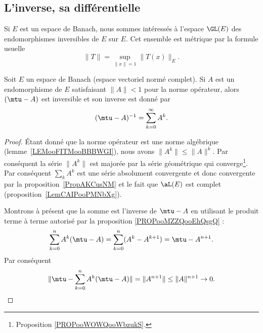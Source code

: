 \subsection{L'inverse, sa différentielle}

Si \( E\) est un espace de Banach, nous sommes intéressés à l'espace \( \GL(E)\) des endomorphismes inversibles de \( E\) sur \( E\). Cet ensemble est métrique par la formule usuelle
\begin{equation}
	\| T \|=\sup_{\| x \|=1}\| T(x) \|_E.
\end{equation}

\begin{proposition}     \label{PropQAjqUNp}
	Soit \( E\) un espace de Banach (espace vectoriel normé complet). Si \( A\) est un endomorphisme de \( E\) satisfaisant  \( \| A \|<1\) pour la norme opérateur, alors \( (\mtu-A)\) est inversible et son inverse est donné par
	\begin{equation}
		(\mtu-A)^{-1}=\sum_{k=0}^{\infty}A^k.
	\end{equation}
\end{proposition}

\begin{proof}
	Étant donné que la norme opérateur est une norme algébrique (lemme~\ref{LEMooFITMooBBBWGI}), nous avons \( \| A^k \|\leq \| A \|^k\). Par conséquent la série \( \| A^k \|\) est majorée par la série géométrique qui converge\footnote{Proposition \ref{PROPooWOWQooWbzukS}.}. Par conséquent \( \sum_{k}A^k\) est une série absolument convergente et donc convergente par la proposition~\ref{PropAKCusNM} et le fait que \( \aL(E)\) est complet (proposition~\ref{LemCAIPooPMNbXg}).

	Montrons à présent que la somme est l'inverse de \( \mtu-A\) en utilisant le produit terme à terme autorisé par la proposition \ref{PROPooMZZQooEhQsgQ} :
	\begin{equation}
		\sum_{k=0}^nA^k(\mtu-A)=\sum_{k=0}^n(A^k-A^{k+1})=\mtu-A^{n+1}.
	\end{equation}
	Par conséquent
	\begin{equation}
		\| \mtu-\sum_{k=0}^nA^k(\mtu-A) \|=\| A^{n+1} \|\leq \| A \|^{n+1}\to 0.
	\end{equation}
\end{proof}

